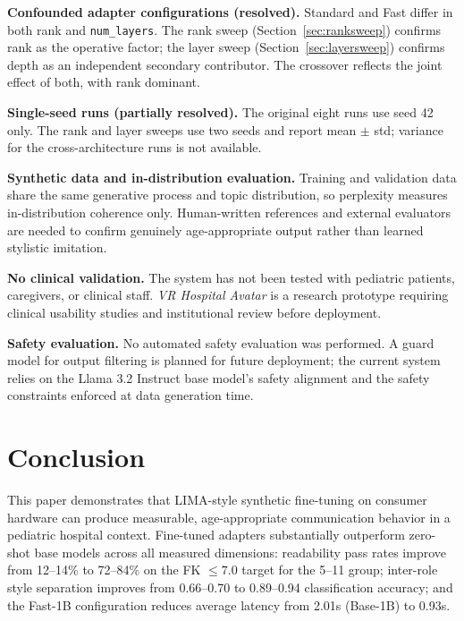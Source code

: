 \documentclass[ASNA,twocolumn]{USG} %
\begin{document}
\textbf{Confounded adapter configurations (resolved).} Standard and Fast differ in both rank and \texttt{num\_layers}. The rank sweep (Section~\ref{sec:ranksweep}) confirms rank as the operative factor; the layer sweep (Section~\ref{sec:layersweep}) confirms depth as an independent secondary contributor. The crossover reflects the joint effect of both, with rank dominant.

\textbf{Single-seed runs (partially resolved).} The original eight runs use seed 42 only. The rank and layer sweeps use two seeds and report mean $\pm$ std; variance for the cross-architecture runs is not available.

\textbf{Synthetic data and in-distribution evaluation.} Training and validation data share the same generative process and topic distribution, so perplexity measures in-distribution coherence only. Human-written references and external evaluators are needed to confirm genuinely age-appropriate output rather than learned stylistic imitation.

\textbf{No clinical validation.} The system has not been tested with pediatric patients, caregivers, or clinical staff. \textit{VR Hospital Avatar} is a research prototype requiring clinical usability studies and institutional review before deployment.

\textbf{Safety evaluation.} No automated safety evaluation was performed. A guard model for output filtering is planned for future deployment; the current system relies on the Llama 3.2 Instruct base model's safety alignment and the safety constraints enforced at data generation time.

\section{Conclusion}

This paper demonstrates that LIMA-style synthetic fine-tuning on consumer hardware can produce measurable, age-appropriate communication behavior in a pediatric hospital context. Fine-tuned adapters substantially outperform zero-shot base models across all measured dimensions: readability pass rates improve from 12--14\% to 72--84\% on the FK $\leq 7.0$ target for the 5--11 group; inter-role style separation improves from 0.66--0.70 to 0.89--0.94 classification accuracy; and the Fast-1B configuration reduces average latency from 2.01s (Base-1B) to 0.93s.
\end{document}
